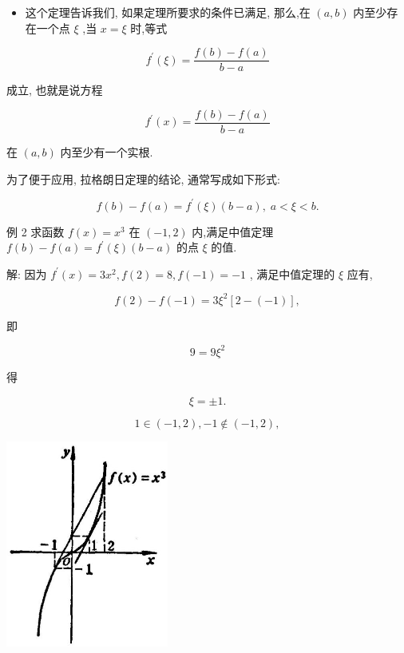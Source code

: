 \documentclass[lang=cn,newtx,10pt,scheme=chinese]{elegantbook}
\begin{document}
\begin{itemize}
\item 这个定理告诉我们, 如果定理所要求的条件已满足, 那么,在 \(\left( {a,b}\right)\) 内至少存在一个点 \(\xi\) ,当 \(x = \xi\) 时,等式
\end{itemize}

\[
{f}^{\prime }\left( \xi \right) = \frac{f\left( b\right) - f\left( a\right) }{b - a}
\]

成立, 也就是说方程

\[
{f}^{\prime }\left( x\right) = \frac{f\left( b\right) - f\left( a\right) }{b - a}
\]

在 \(\left( {a,b}\right)\) 内至少有一个实根.

为了便于应用, 拉格朗日定理的结论, 通常写成如下形式:

\[
f\left( b\right) - f\left( a\right) = {f}^{\prime }\left( \xi \right) \left( {b - a}\right) ,\;a < \xi < b.
\]

例 2 求函数 \(f\left( x\right) = {x}^{3}\) 在 \(\left( {-1,2}\right)\) 内,满足中值定理 \(f\left( b\right) - f\left( a\right) = {f}^{\prime }\left( \xi \right) \left( {b - a}\right)\) 的点 \(\xi\) 的值.

解: 因为 \({f}^{\prime }\left( x\right) = 3{x}^{2},f\left( 2\right) = 8,f\left( {-1}\right) = - 1\) , 满足中值定理的 \(\xi\) 应有,

\[
f\left( 2\right) - f\left( {-1}\right) = 3{\xi }^{2}\left\lbrack {2 - \left( {-1}\right) }\right\rbrack ,
\]

即

\[
9 = 9{\xi }^{2}
\]

得

\[
\xi = \pm 1\text{.}
\]

\[
1 \in \left( {-1,2}\right) , - 1 \notin \left( {-1,2}\right) ,
\]

\begin{center}
\includegraphics[max width=0.4\textwidth]{images/01912c18-5c3f-733d-b775-749ba9897a9d_135_695444.jpg}
\end{center}
\end{document}
